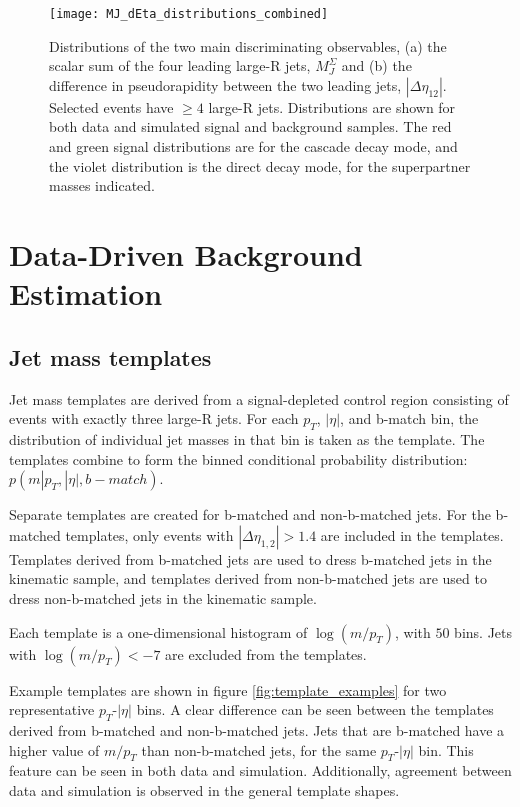 \begin{figure}[h]
\texttt{[image: MJ\_dEta\_distributions\_combined]}
\caption{Distributions of the two main discriminating observables, (a) the scalar sum of the four leading large-R jets, $M_{J}^{\Sigma}$ and (b) the difference in pseudorapidity between the two leading jets, $|\Delta\eta_{12}|$. Selected events have $\geq 4$ large-R jets. Distributions are shown for both data and simulated signal and background samples. The red and green signal distributions are for the cascade decay mode, and the violet distribution is the direct decay mode, for the superpartner masses indicated.}
\label{fig:MJ_dEta_distributions}
\end{figure}

\section{Data-Driven Background Estimation}

\subsection{Jet mass templates}
Jet mass templates are derived from a signal-depleted control region
consisting of events with exactly three large-R jets. For each $p_T$,
$|\eta|$, and b-match bin, the distribution of individual jet masses
in that bin is taken as the template. The templates combine to form
the binned conditional probability distribution: $p(m|p_{T}, |\eta|,
b-match)$.

Separate templates are created for b-matched and non-b-matched jets. For the b-matched templates, only events with
$|\Delta \eta_{1,2}| > 1.4$ are included in the templates. Templates
derived from b-matched jets are used to dress b-matched jets in the
kinematic sample, and templates derived from non-b-matched jets are
used to dress non-b-matched jets in the kinematic sample.

Each template is a one-dimensional histogram of $\log\left(m/p_{T}\right)$,
with $50$ bins. Jets with $\log\left(m/p_{T}\right)< -7$ are excluded
from the templates.

Example templates are shown in figure \ref{fig:template_examples} for
two representative $p_{T}$-$|\eta|$ bins. A clear difference can be
seen between the templates derived from b-matched and non-b-matched
jets. Jets that are b-matched have a higher value of $m/p_{T}$ than
non-b-matched jets, for the same  $p_{T}$-$|\eta|$ bin. This feature
can be seen in both data and simulation. Additionally,
agreement between data and simulation is observed in the general
template shapes.

